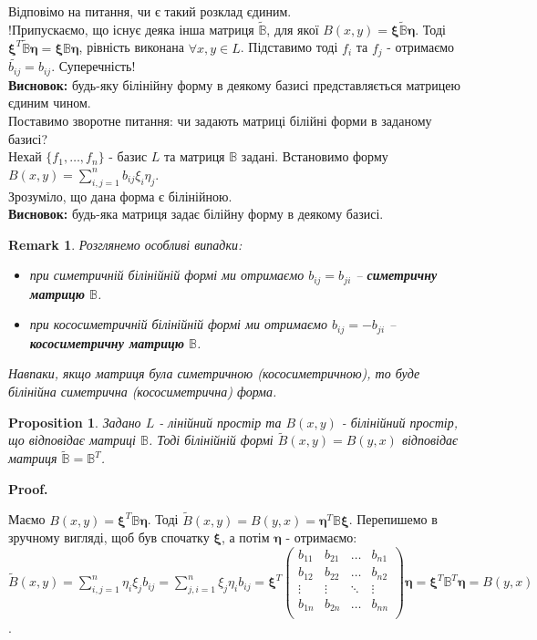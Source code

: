 \documentclass[a4paper, 10pt]{article}
\makeatletter
\theoremstyle{theoremdd}
\newtheorem{proposition}[theorem]{Proposition}
\newtheorem{remark}[theorem]{Remark}
\renewenvironment{proof}[1][Proof.\\]{\par
\pushQED{\hfill \qed}%
\normalfont \topsep6\p@\@plus6\p@\relax
\trivlist
\item\relax
{\bfseries
#1\@addpunct{.}}\hspace\labelsep\ignorespaces
}{%
\popQED\endtrivlist\@endpefalse
}
\makeatother
\begin{document}
Відповімо на питання, чи є такий розклад єдиним. \\
!Припускаємо, що існує деяка інша матриця $\tilde{\mathbb{B}}$, для якої $B(x,y) = \bm{\xi} \tilde{\mathbb{B}} \bm{\eta}$. Тоді $\bm{\xi}^T \tilde{\mathbb{B}} \bm{\eta} = \bm{\xi} \mathbb{B} \bm{\eta}$, рівність виконана $\forall x,y \in L$. Підставимо тоді $f_i$ та $f_j$ - отримаємо $\tilde{b_{ij}} = b_{ij} $. Суперечність!\\
\textbf{Висновок:} будь-яку білінійну форму в деякому базисі представляється матрицею єдиним чином.
\bigskip \\
Поставимо зворотне питання: чи задають матриці білійні форми в заданому базисі?\\
Нехай $\{f_1,\dots,f_n\}$ - базис $L$ та матриця $\mathbb{B}$ задані. Встановимо форму $B(x,y) = \displaystyle\sum_{i,j=1}^n b_{ij}\xi_i \eta_j$.\\
Зрозуміло, що дана форма є білінійною.\\
\textbf{Висновок:} будь-яка матриця задає білійну форму в деякому базисі.

\begin{remark}
Розглянемо особливі випадки:
\begin{itemize}[label={-}, nosep, wide=0pt]
\item при симетричній білінійній формі ми отримаємо $b_{ij} = b_{ji}$ -- \textbf{симетричну матрицю} $\mathbb{B}$.
\item при кососиметричній білінійній формі ми отримаємо $b_{ij} = -b_{ji}$ -- \textbf{кососиметричну матрицю} $\mathbb{B}$.
\end{itemize}
Навпаки, якщо матриця була симетричною (кососиметричною), то буде білінійна симетрична (кососиметрична) форма.
\end{remark}

\begin{proposition}
Задано $L$ - лінійний простір та $B(x,y)$ - білінійний простір, що відповідає матриці $\mathbb{B}$. Тоді білінійній формі $\widetilde{B}(x,y) = B(y,x)$ відповідає матриця $\widetilde{\mathbb{B}} = \mathbb{B}^T$.
\end{proposition}

\begin{proof}
Маємо $B(x,y) = \bm{\xi}^T \mathbb{B} \bm{\eta}$. Тоді $\widetilde{B}(x,y) = B(y,x) = \bm{\eta}^T \mathbb{B} \bm{\xi}$. Перепишемо в зручному вигляді, щоб був спочатку $\bm{\xi}$, а потім $\bm{\eta}$ - отримаємо:\\
$\widetilde{B}(x,y) = \displaystyle\sum_{i,j=1}^n \eta_i \xi_j b_{ij} = \displaystyle\sum_{j,i=1}^n \xi_j \eta_i b_{ij} = \bm{\xi}^T \begin{pmatrix}
b_{11} & b_{21} & \dots & b_{n1} \\
b_{12} & b_{22} & \dots & b_{n2} \\
\vdots & \vdots & \ddots & \vdots \\
b_{1n} & b_{2n} & \dots & b_{nn} \\
\end{pmatrix} \bm{\eta} = \bm{\xi}^T \mathbb{B}^T \bm{\eta} = B(y,x)$.
\end{proof}
\end{document}
